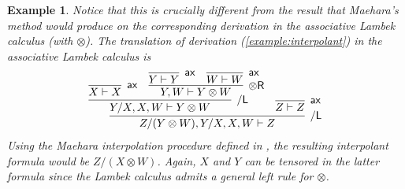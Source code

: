 \documentclass[sn-mathphys-num]{sn-jnl}%
\newcommand{\vd}{\vdash}
\newcommand{\tr}{\otimes\mathsf{R}}
\newcommand{\ax}{\mathsf{ax}}
\newcommand{\ot}{\otimes}
\newcommand{\sls}{\slash}
\newcommand{\mf}[1]{\mathsf{#1}}
\theoremstyle{thmstyleone}%
\theoremstyle{thmstyletwo}%
\newtheorem{example}[theorem]{Example}%
\theoremstyle{thmstylethree}%
\begin{document}
\begin{example}
  Notice that this is crucially different from the result that Maehara's method would produce on the corresponding derivation in the associative Lambek calculus (with $\ot$). The translation of derivation (\ref{example:interpolant}) in the associative Lambek calculus is
  \begin{displaymath}
    \begin{array}{c}
      \infer[\sls\mf{L}]{Z \sls (Y \ot W) , Y \sls X , X, W \vd Z}{
      \infer[\sls\mf{L}]{Y \sls X , X , W \vd Y \ot W}{
      \infer[\ax]{X \vd X}{}
      &
      \infer[\tr]{Y , W \vd Y \ot W}{
      \infer[\ax]{Y \vd Y}{}
      &
      \infer[\ax]{W \vd W}{}
      }
      }
      &
      \infer[\ax]{Z \vd Z}{}
      }
    \end{array}
  \end{displaymath}
  Using the Maehara interpolation procedure defined in \cite{moot:categorial:2012}, the resulting interpolant formula would be ${Z \sls (X \ot W)}$. Again, $X$ and $Y$ can be tensored in the latter formula since the Lambek calculus admits a general left rule for $\ot$.
\end{example}
\end{document}
